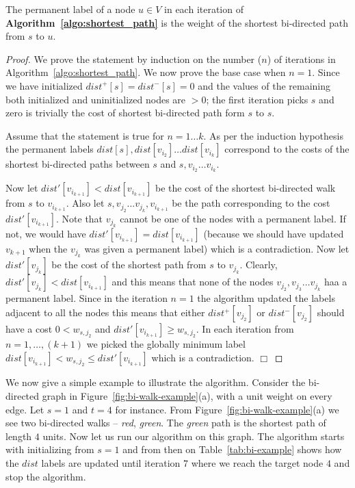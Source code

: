 \documentclass[runningheads]{llncs}
\begin{document}
\begin{theorem}
The permanent label of a node $u\in V$ in each iteration of {\bf Algorithm~\ref{algo:shortest_path}} is the weight of the
shortest bi-directed path from $s$ to $u$.
\end{theorem}
\begin{proof}
We prove the statement by induction on the number ($n$) of iterations in 
Algorithm~\ref{algo:shortest_path}. We now prove the base case when $n=1$. Since
we have initialized $dist^+[s] = dist^-[s] = 0$ and the values of the remaining
both initialized and uninitialized nodes are $>0$; the first iteration picks $s$ and zero
is trivially the cost of shortest bi-directed path form $s$ to $s$. 

Assume that the statement is true for $n=1\dots k$. As per the induction hypothesis the permanent labels 
$dist[s], dist[v_{i_2}] \ldots dist[v_{i_k}]$ correspond to the costs of the shortest 
bi-directed paths between $s$ and $s,v_{i_2}\ldots v_{i_k}$. 

Now let $dist'[v_{i_{k+1}}] < dist[v_{i_{k+1}}]$
be the cost of the shortest bi-directed walk from $s$ to $v_{i_{k+1}}$. Also let 
$s,v_{j_2}\ldots v_{j_k},v_{i_{k+1}}$ be the path corresponding to the cost $dist'[v_{i_{k+1}}]$.
Note that $v_{j_k}$ cannot be one of the nodes with a permanent label. 
If not, we would have $dist'[v_{i_{k+1}}] = dist[v_{i_{k+1}}]$ 
(because we should have updated $v_{k+1}$ when the $v_{j_k}$ was given a permanent label) which is a contradiction. 
Now let $dist'[v_{j_k}]$ be the cost of the shortest path from $s$ to $v_{j_k}$. Clearly, 
$dist'[v_{j_k}] < dist[v_{i_{k+1}}]$ and this means that none of the nodes $v_{j_2}, v_{j_3} \ldots v_{j_k}$ haa a permanent label. Since in the iteration $n=1$ the algorithm updated the labels adjacent to
all the nodes this means that either $dist^+[v_{j_2}]$ or $dist^-[v_{j_2}]$ should have a cost $0<w_{s,j_2}$
and $dist'[v_{i_{k+1}}] \geq w_{s,j_2}$. In each iteration from $n = 1,\ldots, (k+1)$ we picked the globally 
minimum label $dist[v_{i_{k+1}}] < w_{s, j_2} \leq dist'[v_{i_{k+1}}]$ which is a contradiction. 
$\Box$
\end{proof}

We now give a simple example to illustrate the algorithm. Consider the bi-directed graph in 
Figure~\ref{fig:bi-walk-example}(a), with a unit weight on every edge. Let $s=1$ and $t=4$ for instance. 
From Figure~\ref{fig:bi-walk-example}(a) we see two bi-directed walks -- {\em red}, {\em green}.
The {\em green} path is the shortest path of length $4$ units. Now let us run our algorithm on this
graph. The algorithm starts with initializing from $s=1$ and from then on Table~\ref{tab:bi-example}
shows how the $dist$ labels are updated until iteration $7$ where we reach the target node $4$ and stop
the algorithm.
\end{document}
